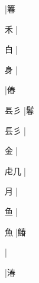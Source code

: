 \begin{multicols}{2}
{{}\mktsJzrVerticalBar{}{\cjk{}{\cnsym{}　}{\cnsym{}　}{\cnsym{}　}}|{\cjk{}箺}\par
{\cjk{}{\cnsym{}　}禾{\cnxJzr{}}}\mktsJzrVerticalBar{}{\cjk{}{\cnsym{}　}{\cnsym{}　}{\cnsym{}　}}|{}\par
{\cjk{}{\cnsym{}　}白{\cnxJzr{}}}\mktsJzrVerticalBar{}{\cjk{}{\cnsym{}　}{\cnsym{}　}{\cnsym{}　}}|{}\par
{\cjk{}{\cnsym{}　}身{\cnxJzr{}}}\mktsJzrVerticalBar{}{\cjk{}{\cnsym{}　}{\cnsym{}　}{\cnsym{}　}}|{}\par
{}\mktsJzrVerticalBar{}{\cjk{}{\cnsym{}　}{\cnsym{}　}{\cnsym{}　}}|{\cjk{}偆}\par
{\cjk{}镸彡{\cnxJzr{}}}\mktsJzrVerticalBar{}{\cjk{}{\cnsym{}　}{\cnsym{}　}{\cnsym{}　}}|{\cjk{}鬊}\par
{\cjk{}镸彡{\cnxJzr{}}}|{}\par
{\cjk{}{\cnsym{}　}金{\cnxJzr{}}}\mktsJzrVerticalBar{}{\cjk{}{\cnsym{}　}{\cnsym{}　}{\cnsym{}　}}|{}\par
{\cjk{}虍几{\cnxJzr{}}}\mktsJzrVerticalBar{}{\cjk{}{\cnsym{}　}{\cnsym{}　}{\cnsym{}　}}|{}\par
{\cjk{}{\cnsym{}　}月{\cnxJzr{}}}\mktsJzrVerticalBar{}{\cjk{}{\cnsym{}　}{\cnsym{}　}{\cnsym{}　}}|{}\par
{\cjk{}{\cnsym{}　}鱼{\cnxJzr{}}}\mktsJzrVerticalBar{}{\cjk{}{\cnsym{}　}{\cnsym{}　}{\cnsym{}　}}|{}\par
{\cjk{}{\cnsym{}　}魚{\cnxJzr{}}}\mktsJzrVerticalBar{}{\cjk{}{\cnsym{}　}{\cnsym{}　}{\cnsym{}　}}|{\cjk{}鰆}\par
{}\mktsJzrVerticalBar{}{\cjk{}{\cnsym{}　}{\cnsym{}　}{\cnsym{}　}}|{}\par
{}\mktsJzrVerticalBar{}{\cjk{}{\cnsym{}　}{\cnsym{}　}{\cnsym{}　}}|{\cjk{}湷}\par
}
\end{multicols}
